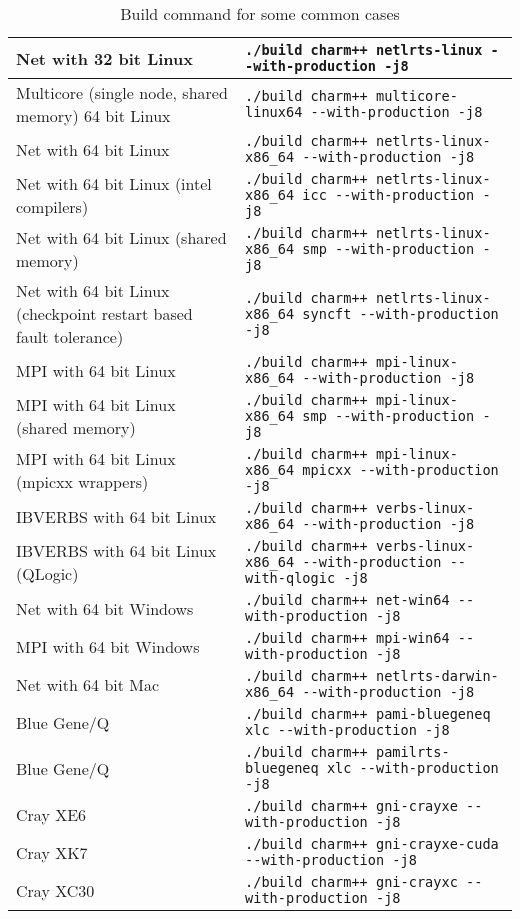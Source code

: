 \begin{table}[ht]
\begin{tabular}{|p{6cm}|p{9cm}|}
\hline
Net with 32 bit Linux & \verb|./build charm++ netlrts-linux --with-production -j8|
\\\hline
Multicore (single node, shared memory) 64 bit Linux & \verb|./build charm++ multicore-linux64 --with-production -j8|
\\\hline
Net with 64 bit Linux & \verb|./build charm++ netlrts-linux-x86_64 --with-production -j8|
\\\hline
Net with 64 bit Linux (intel compilers) & \verb|./build charm++ netlrts-linux-x86_64 icc --with-production -j8|
\\\hline
Net with 64 bit Linux (shared memory) & \verb|./build charm++ netlrts-linux-x86_64 smp --with-production -j8|
\\\hline
Net with 64 bit Linux (checkpoint restart based fault tolerance) & \verb|./build charm++ netlrts-linux-x86_64 syncft --with-production -j8|
\\\hline
MPI with 64 bit Linux & \verb|./build charm++ mpi-linux-x86_64 --with-production -j8|
\\\hline
MPI with 64 bit Linux (shared memory) & \verb|./build charm++ mpi-linux-x86_64 smp --with-production -j8|
\\\hline
MPI with 64 bit Linux (mpicxx wrappers) & \verb|./build charm++ mpi-linux-x86_64 mpicxx --with-production -j8|
\\\hline
IBVERBS with 64 bit Linux & \verb|./build charm++ verbs-linux-x86_64 --with-production -j8|
\\\hline
IBVERBS with 64 bit Linux (QLogic) & \verb|./build charm++ verbs-linux-x86_64 --with-production --with-qlogic -j8|
\\\hline
Net with 64 bit Windows & \verb|./build charm++ net-win64 --with-production -j8|
\\\hline
MPI with 64 bit Windows & \verb|./build charm++ mpi-win64 --with-production -j8|
\\\hline
Net with 64 bit Mac & \verb|./build charm++ netlrts-darwin-x86_64 --with-production -j8|
\\\hline
Blue Gene/Q & \verb|./build charm++ pami-bluegeneq xlc --with-production -j8|
\\\hline
Blue Gene/Q & \verb|./build charm++ pamilrts-bluegeneq xlc --with-production -j8|
\\\hline
Cray XE6 & \verb|./build charm++ gni-crayxe --with-production -j8|
\\\hline
Cray XK7 & \verb|./build charm++ gni-crayxe-cuda --with-production -j8|
\\\hline
Cray XC30 & \verb|./build charm++ gni-crayxc --with-production -j8|
\\\hline
\end{tabular}
\caption{Build command for some common cases}
\label{tab:buildlist}
\end{table}

